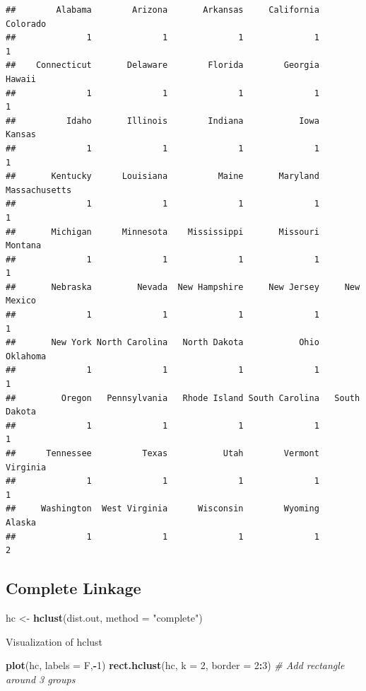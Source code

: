 \documentclass[
]{book}
\newenvironment{Shaded}{\begin{snugshade}}{\end{snugshade}}
\newcommand{\CommentTok}[1]{\textcolor[rgb]{0.56,0.35,0.01}{\textit{#1}}}
\newcommand{\DataTypeTok}[1]{\textcolor[rgb]{0.13,0.29,0.53}{#1}}
\newcommand{\DecValTok}[1]{\textcolor[rgb]{0.00,0.00,0.81}{#1}}
\newcommand{\KeywordTok}[1]{\textcolor[rgb]{0.13,0.29,0.53}{\textbf{#1}}}
\newcommand{\NormalTok}[1]{#1}
\newcommand{\OperatorTok}[1]{\textcolor[rgb]{0.81,0.36,0.00}{\textbf{#1}}}
\newcommand{\StringTok}[1]{\textcolor[rgb]{0.31,0.60,0.02}{#1}}
\begin{document}
\begin{verbatim}
##        Alabama        Arizona       Arkansas     California       Colorado 
##              1              1              1              1              1 
##    Connecticut       Delaware        Florida        Georgia         Hawaii 
##              1              1              1              1              1 
##          Idaho       Illinois        Indiana           Iowa         Kansas 
##              1              1              1              1              1 
##       Kentucky      Louisiana          Maine       Maryland  Massachusetts 
##              1              1              1              1              1 
##       Michigan      Minnesota    Mississippi       Missouri        Montana 
##              1              1              1              1              1 
##       Nebraska         Nevada  New Hampshire     New Jersey     New Mexico 
##              1              1              1              1              1 
##       New York North Carolina   North Dakota           Ohio       Oklahoma 
##              1              1              1              1              1 
##         Oregon   Pennsylvania   Rhode Island South Carolina   South Dakota 
##              1              1              1              1              1 
##      Tennessee          Texas           Utah        Vermont       Virginia 
##              1              1              1              1              1 
##     Washington  West Virginia      Wisconsin        Wyoming         Alaska 
##              1              1              1              1              2
\end{verbatim}

\hypertarget{complete-linkage}{%
\subsection{Complete Linkage}\label{complete-linkage}}

\begin{Shaded}
\begin{Highlighting}[]
\NormalTok{hc <-}\StringTok{ }\KeywordTok{hclust}\NormalTok{(dist.out, }\DataTypeTok{method =} \StringTok{"complete"}\NormalTok{)}
\end{Highlighting}
\end{Shaded}

Visualization of hclust

\begin{Shaded}
\begin{Highlighting}[]
\KeywordTok{plot}\NormalTok{(hc, }\DataTypeTok{labels =}\NormalTok{ F,}\OperatorTok{-}\DecValTok{1}\NormalTok{)}
\KeywordTok{rect.hclust}\NormalTok{(hc, }\DataTypeTok{k =} \DecValTok{2}\NormalTok{, }\DataTypeTok{border =} \DecValTok{2}\OperatorTok{:}\DecValTok{3}\NormalTok{) }\CommentTok{# Add rectangle around 3 groups}
\end{Highlighting}
\end{Shaded}
\end{document}
